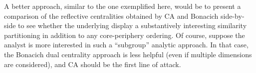 \documentclass[a4paper,fleqn]{cas-sc}
\begin{document}
A better approach, similar to the one exemplified here, would be to present a comparison of the reflective centralities obtained by CA and Bonacich side-by-side to see whether the underlying display a substantively interesting similarity partitioning in addition to any core-periphery ordering. Of course, suppose the analyst is more interested in such a ``subgroup'' analytic approach. In that case, the Bonacich dual centrality approach is less helpful (even if multiple dimensions are considered), and CA should be the first line of attack. 



%


\end{document}
